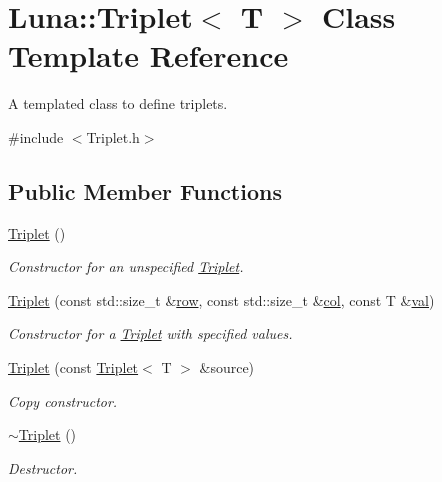 \hypertarget{classLuna_1_1Triplet}{}\section{Luna\+:\+:Triplet$<$ T $>$ Class Template Reference}
\label{classLuna_1_1Triplet}


A templated class to define triplets.  




{\ttfamily \#include $<$Triplet.\+h$>$}

\subsection*{Public Member Functions}
\begin{DoxyCompactItemize}
\item 
\hyperlink{classLuna_1_1Triplet_a28f240b4dbca519a16bbe7de02710576}{Triplet} ()
\begin{DoxyCompactList}\small\item\em Constructor for an unspecified \hyperlink{classLuna_1_1Triplet}{Triplet}. \end{DoxyCompactList}\item 
\hyperlink{classLuna_1_1Triplet_a18671ffc604a9999c3a4e1b0256d61af}{Triplet} (const std\+::size\+\_\+t \&\hyperlink{classLuna_1_1Triplet_aea4263baad8dcba4eb238c404f1ad2e7}{row}, const std\+::size\+\_\+t \&\hyperlink{classLuna_1_1Triplet_a5797cd45bf76a6baf60f7aa4741ffec2}{col}, const T \&\hyperlink{classLuna_1_1Triplet_a622ca1a37e1661cb4e2a5932fb6806a9}{val})
\begin{DoxyCompactList}\small\item\em Constructor for a \hyperlink{classLuna_1_1Triplet}{Triplet} with specified values. \end{DoxyCompactList}\item 
\hyperlink{classLuna_1_1Triplet_ad7e7c8465cacde874a5f675310e30b6b}{Triplet} (const \hyperlink{classLuna_1_1Triplet}{Triplet}$<$ T $>$ \&source)
\begin{DoxyCompactList}\small\item\em Copy constructor. \end{DoxyCompactList}\item 
\hyperlink{classLuna_1_1Triplet_a59099a7ab671a6c357e9ae6570b0697a}{$\sim$\+Triplet} ()
\begin{DoxyCompactList}\small\item\em Destructor. \end{DoxyCompactList}\item 

\end{DoxyCompactItemize}
